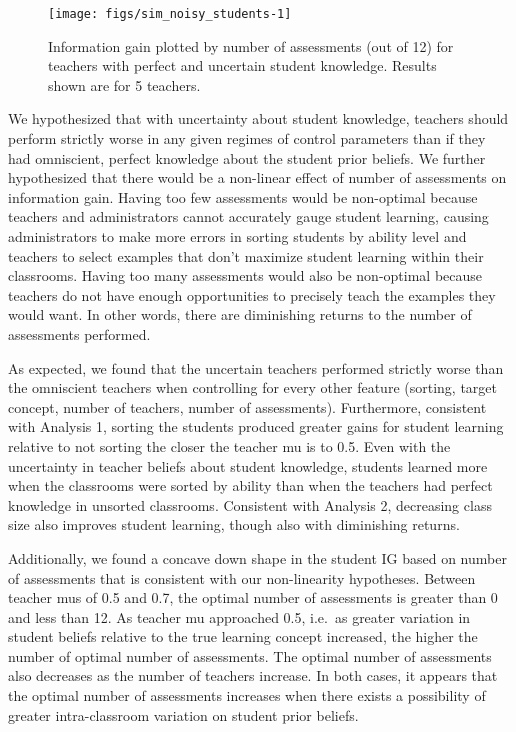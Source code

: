 \documentclass[10pt, letterpaper]{article}
\newenvironment{CodeChunk}{}{}
\begin{document}
\begin{CodeChunk}
\begin{figure*}[t]
\texttt{[image: figs/sim\_noisy\_students-1]} \caption[Information gain plotted by number of assessments (out of 12) for teachers with perfect and uncertain student knowledge]{Information gain plotted by number of assessments (out of 12) for teachers with perfect and uncertain student knowledge. Results shown are for 5 teachers.}\label{fig:sim_noisy_students}
\end{figure*}
\end{CodeChunk}

We hypothesized that with uncertainty about student knowledge, teachers
should perform strictly worse in any given regimes of control parameters
than if they had omniscient, perfect knowledge about the student prior
beliefs. We further hypothesized that there would be a non-linear effect
of number of assessments on information gain. Having too few assessments
would be non-optimal because teachers and administrators cannot
accurately gauge student learning, causing administrators to make more
errors in sorting students by ability level and teachers to select
examples that don't maximize student learning within their classrooms.
Having too many assessments would also be non-optimal because teachers
do not have enough opportunities to precisely teach the examples they
would want. In other words, there are diminishing returns to the number
of assessments performed.

As expected, we found that the uncertain teachers performed strictly
worse than the omniscient teachers when controlling for every other
feature (sorting, target concept, number of teachers, number of
assessments). Furthermore, consistent with Analysis 1, sorting the
students produced greater gains for student learning relative to not
sorting the closer the teacher mu is to 0.5. Even with the uncertainty
in teacher beliefs about student knowledge, students learned more when
the classrooms were sorted by ability than when the teachers had perfect
knowledge in unsorted classrooms. Consistent with Analysis 2, decreasing
class size also improves student learning, though also with diminishing
returns.

Additionally, we found a concave down shape in the student IG based on
number of assessments that is consistent with our non-linearity
hypotheses. Between teacher mus of 0.5 and 0.7, the optimal number of
assessments is greater than 0 and less than 12. As teacher mu approached
0.5, i.e.~as greater variation in student beliefs relative to the true
learning concept increased, the higher the number of optimal number of
assessments. The optimal number of assessments also decreases as the
number of teachers increase. In both cases, it appears that the optimal
number of assessments increases when there exists a possibility of
greater intra-classroom variation on student prior beliefs.
\end{document}
